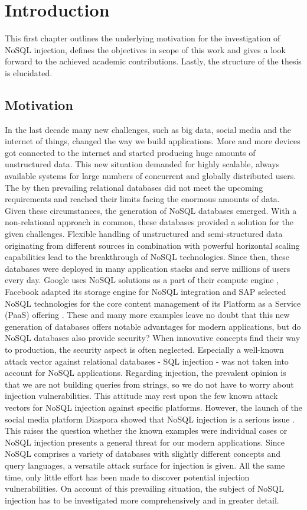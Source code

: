 \chapter{Introduction}
\label{cha:introduction}
This first chapter outlines the underlying motivation for the investigation of NoSQL injection, defines the objectives in scope of this work and gives a look forward to the achieved academic contributions. Lastly, the structure of the thesis is elucidated.

\section{Motivation}
In the last decade many new challenges, such as big data, social media and the internet of things, changed the way we build applications. More and more devices got connected to the internet and started producing huge amounts of unstructured data. This new situation demanded for highly scalable, always available systems for large numbers of concurrent and globally distributed users. The by then prevailing relational databases did not meet the upcoming requirements and reached their limits facing the enormous amounts of data. Given these circumstances, the generation of NoSQL databases emerged. With a non-relational approach in common, these databases provided a solution for the given challenges. Flexible handling of unstructured and semi-structured data originating from different sources in combination with powerful horizontal scaling capabilities lead to the breakthrough of NoSQL technologies. Since then, these databases were deployed in many application stacks and serve millions of users every day. Google uses NoSQL solutions as a part of their compute engine \cite{MongoDB_Google:2016}, Facebook adapted its storage engine for NoSQL integration \cite{MongoDB_Facebook:2016} and SAP selected NoSQL technologies for the core content management of its Platform as a Service (PaaS) offering \cite{MongoDB_SAP:2016}. These and many more examples leave no doubt that this new generation of databases offers notable advantages for modern applications, but do NoSQL databases also provide security? When innovative concepts find their way to production, the security aspect is often neglected. Especially a well-known attack vector against relational databases - SQL injection - was not taken into account for NoSQL applications. Regarding injection, the prevalent opinion is that we are not building queries from strings, so we do not have to worry about injection vulnerabilities. This attitude may rest upon the few known attack vectors for NoSQL injection against specific platforms. However, the launch of the social media platform Diaspora showed that NoSQL injection is a serious issue \cite{McKenzie:2010}. This raises the question whether the known examples were individual cases or NoSQL injection presents a general threat for our modern applications. Since NoSQL comprises a variety of databases with slightly different concepts and query languages, a versatile attack surface for injection is given. All the same time, only little effort has been made to discover potential injection vulnerabilities. On account of this prevailing situation, the subject of NoSQL injection has to be investigated more comprehensively and in greater detail.

